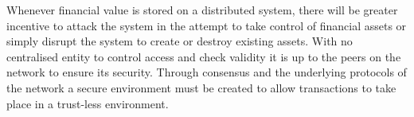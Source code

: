 Whenever financial value is stored on a distributed system, there will be greater incentive to attack the system in the attempt to take control of financial assets or simply disrupt the system to create or destroy existing assets. %
With no centralised entity to control access and check validity it is up to the peers on the network to ensure its security. Through consensus and the underlying protocols of the network a secure environment must be created to allow transactions to take place in a trust-less environment. 
